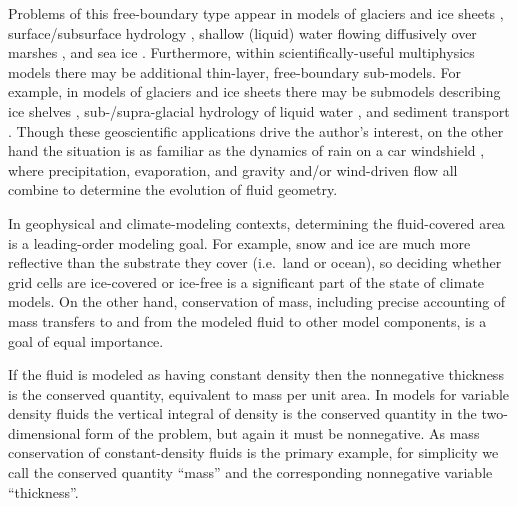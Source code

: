 \documentclass[final,leqno,onefignum,onetabnum]{siamltex1213bueler}
\begin{document}
Problems of this free-boundary type appear in models of glaciers and ice sheets \cite{Bueler2016,CalvoDuranyVazquez2000,Calvoetal2002,EgholmNielsen2010,JouvetBueler2012},  surface/subsurface hydrology \cite{Maxwelletal2014}, shallow (liquid) water flowing diffusively over marshes \cite{AlonsoSantillanaDawson2008}, and sea ice \cite{LipscombHunke2004,Thorndikeetal1975}.  Furthermore, within scientifically-useful multiphysics models there may be additional thin-layer, free-boundary sub-models.  For example, in models of glaciers and ice sheets there may be submodels describing ice shelves \cite{Albrechtetal2011}, sub-/supra-glacial hydrology of liquid water \cite{Aschwandenetal2012,BuelervanPelt2015,Schoofetal2012}, and sediment transport \cite{Brinkerhoffetal2017}.  Though these geoscientific applications drive the author's interest, on the other hand the situation is as familiar as the dynamics of rain on a car windshield \cite{Kondic2003}, where precipitation, evaporation, and gravity and/or wind-driven flow all combine to determine the evolution of fluid geometry.

In geophysical and climate-modeling contexts, determining the fluid-covered area is a leading-order modeling goal.  For example, snow and ice are much more reflective than the substrate they cover (i.e.~land or ocean), so deciding whether grid cells are ice-covered or ice-free is a significant part of the state of climate models.  On the other hand, conservation of mass, including precise accounting of mass transfers to and from the modeled fluid to other model components, is a goal of equal importance.

If the fluid is modeled as having constant density then the nonnegative thickness is the conserved quantity, equivalent to mass per unit area.  In models for variable density fluids the vertical integral of density is the conserved quantity in the two-dimensional form of the problem, but again it must be nonnegative.  As mass conservation of constant-density fluids is the primary example, for simplicity we call the conserved quantity ``mass'' and the corresponding nonnegative variable ``thickness''.
\end{document}

